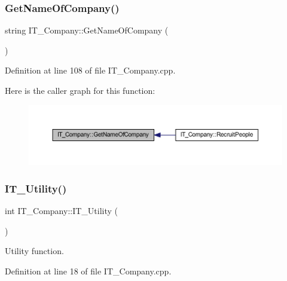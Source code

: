 \subsubsection{\texorpdfstring{Get\+Name\+Of\+Company()}{GetNameOfCompany()}}
{\footnotesize\ttfamily string I\+T\+\_\+\+Company\+::\+Get\+Name\+Of\+Company (\begin{DoxyParamCaption}{ }\end{DoxyParamCaption})}



Definition at line 108 of file I\+T\+\_\+\+Company.\+cpp.

Here is the caller graph for this function\+:
\nopagebreak
\begin{figure}[H]
\begin{center}
\leavevmode
\includegraphics[width=350pt]{class_i_t___company_addd5ab4a8699d8df60fd2cd00a4f9875_icgraph}
\end{center}
\end{figure}
\mbox{\label{class_i_t___company_a06d2d0d74d96533e474618fb92291c04}} 
\subsubsection{\texorpdfstring{I\+T\+\_\+\+Utility()}{IT\_Utility()}}
{\footnotesize\ttfamily int I\+T\+\_\+\+Company\+::\+I\+T\+\_\+\+Utility (\begin{DoxyParamCaption}{ }\end{DoxyParamCaption})\hspace{0.3cm}{\ttfamily [private]}}



Utility function. 



Definition at line 18 of file I\+T\+\_\+\+Company.\+cpp.

